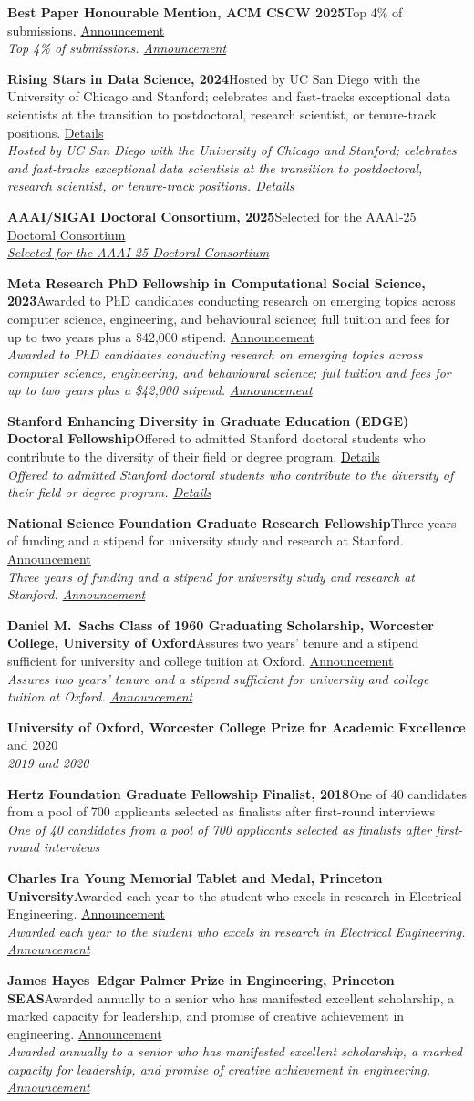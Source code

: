 \documentclass[11pt,letterpaper]{article}
\newcommand{\honor}[2]{%
  \Needspace{3\baselineskip}%
  \item \textbf{#1}\ifx\relax#2\relax\else\\{\small\itshape\color{inksoft}#2}\fi
}
\begin{document}
\begin{plain}
\honor{Best Paper Honourable Mention, ACM CSCW 2025}{Top 4\% of submissions. \href{https://medium.com/acm-cscw/announcing-the-best-of-cscw-2025-a95517e67ba3}{Announcement}}
\honor{Rising Stars in Data Science, 2024}{Hosted by UC San Diego with the University of Chicago and Stanford; celebrates and fast-tracks exceptional data scientists at the transition to postdoctoral, research scientist, or tenure-track positions. \href{https://datascience.stanford.edu/news/shining-light-emerging-talent-rising-stars-data-science-2024-recap}{Details}}
\honor{AAAI/SIGAI Doctoral Consortium, 2025}{\href{https://aaai.org/conference/aaai/aaai-25/}{Selected for the AAAI-25 Doctoral Consortium}}
\honor{Meta Research PhD Fellowship in Computational Social Science, 2023}{Awarded to PhD candidates conducting research on emerging topics across computer science, engineering, and behavioural science; full tuition and fees for up to two years plus a \$42,000 stipend. \href{https://research.facebook.com/fellows/hanley-hans-william-alexander/}{Announcement}}
\honor{Stanford Enhancing Diversity in Graduate Education (EDGE) Doctoral Fellowship}{Offered to admitted Stanford doctoral students who contribute to the diversity of their field or degree program. \href{https://vpge.stanford.edu/fellowships-funding/current-vpge-fellows/all-2020}{Details}}
\honor{National Science Foundation Graduate Research Fellowship}{Three years of funding and a stipend for university study and research at Stanford. \href{https://ece.princeton.edu/news/seven-current-and-former-students-awarded-nsf-graduate-research-fellowships}{Announcement}}
\honor{Daniel M.~Sachs Class of 1960 Graduating Scholarship, Worcester College, University of Oxford}{Assures two years' tenure and a stipend sufficient for university and college tuition at Oxford. \href{https://www.princeton.edu/news/2017/12/11/princeton-seniors-hanley-and-silver-oxford-graduate-student-barnett-named-sachs}{Announcement}}
\honor{University of Oxford, Worcester College Prize for Academic Excellence}{2019 and 2020}
\honor{Hertz Foundation Graduate Fellowship Finalist, 2018}{One of 40 candidates from a pool of 700 applicants selected as finalists after first-round interviews}
\honor{Charles Ira Young Memorial Tablet and Medal, Princeton University}{Awarded each year to the student who excels in research in Electrical Engineering. \href{https://ece.princeton.edu/news/undergraduates-honored-class-day-2018}{Announcement}}
\honor{James Hayes--Edgar Palmer Prize in Engineering, Princeton SEAS}{Awarded annually to a senior who has manifested excellent scholarship, a marked capacity for leadership, and promise of creative achievement in engineering. \href{https://engineering.princeton.edu/news/2018/06/05/class-day-awards-celebrate-graduates-contributions-research-and-service}{Announcement}}

\end{plain}
\end{document}

